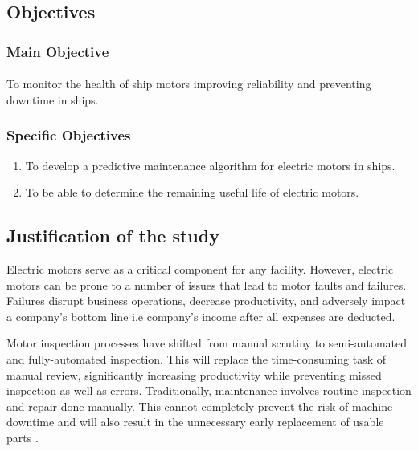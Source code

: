 \subsection{Objectives}
\subsubsection{Main Objective}
\paragraph{}  To monitor the health of ship motors improving reliability and preventing downtime
in ships. 
\subsubsection{Specific Objectives}
\begin{enumerate}
\item  To develop a predictive maintenance algorithm for electric motors in ships.
\item To be able to determine the remaining useful life of electric motors. 

\end{enumerate}
\subsection{Justification of the study}
Electric motors serve as a critical component for any facility. However, electric motors can be prone to a number of issues that lead to motor faults and failures. Failures disrupt business operations, decrease productivity, and adversely impact a company’s bottom line i.e company's income after all expenses are deducted. 

Motor inspection processes have shifted from manual scrutiny to semi-automated and fully-automated inspection. This will replace the time-consuming task of manual review, significantly increasing productivity while preventing missed inspection as well as errors. Traditionally, maintenance involves routine inspection and repair done manually. This cannot completely prevent the risk of machine downtime and will also result in the unnecessary early replacement of usable parts \cite{sampaio_prediction_2019}.  


